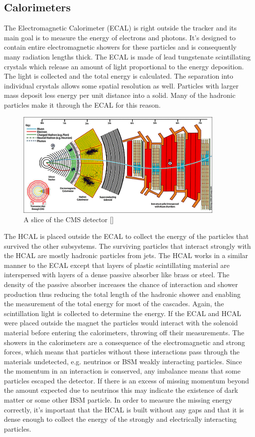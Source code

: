 \FloatBarrier
\subsection{Calorimeters}
The Electromagnetic Calorimeter (ECAL) is right outside the tracker and its main goal is to measure the energy of electrons and photons. It's designed to contain entire electromagnetic showers for these particles and is consequently many radiation lengths thick. The ECAL is made of lead tungstenate scintillating crystals which release an amount of light proportional to the energy deposition. The light is collected and the total energy is calculated. The separation into individual crystals allows some spatial resolution as well. Particles with larger mass deposit less energy per unit distance into a solid. Many of the hadronic particles make it through the ECAL for this reason.

\begin{figure}[h!]
  \centering
  \includegraphics[width=4in]{images/cms_slice.jpg}
  \caption
   {A slice of the CMS detector [\cite{cmsweb}]}
  \label{fig:cmsdetslice}
\end{figure}

The HCAL is placed outside the ECAL to collect the energy of the particles that survived the other subsystems. The surviving particles that interact strongly with the HCAL are mostly hadronic particles from jets. The HCAL works in a similar manner to the ECAL except that layers of plastic scintillating material are interspersed with layers of a dense passive absorber like brass or steel. The density of the passive absorber increases the chance of interaction and shower production thus reducing the total length of the hadronic shower and enabling the measurement of the total energy for most of the cascades. Again, the scintillation light is collected to determine the energy. If the ECAL and HCAL were placed outside the magnet the particles would interact with the solenoid material before entering the calorimeters, throwing off their measurements. The showers in the calorimeters are a consequence of the electromagnetic and strong forces, which means that particles without these interactions pass through the materials undetected, e.g. neutrinos or BSM weakly interacting particles. Since the momentum in an interaction is conserved, any imbalance means that some particles escaped the detector. If there is an excess of missing momentum beyond the amount expected due to neutrinos this may indicate the existence of dark matter or some other BSM particle. In order to measure the missing energy correctly, it's important that the HCAL is built without any gaps and that it is dense enough to collect the energy of the strongly and electrically interacting particles.

